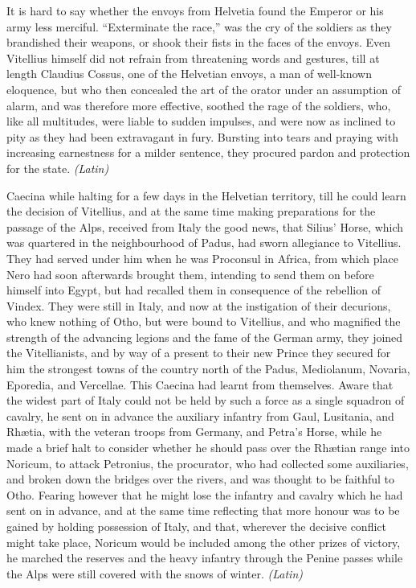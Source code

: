
It is hard to say whether the envoys from Helvetia found the Emperor or his army less merciful. ``Exterminate the race,'' was the cry of the soldiers as they brandished their weapons, or shook their fists in the faces of the envoys. Even Vitellius himself did not refrain from threatening words and gestures, till at length Claudius Cossus, one of the Helvetian envoys, a man of well-known eloquence, but who then concealed the art of the orator under an assumption of alarm, and was therefore more effective, soothed the rage of the soldiers, who, like all multitudes, were liable to sudden impulses, and were now as inclined to pity as they had been extravagant in fury. Bursting into tears and praying with increasing earnestness for a milder sentence, they procured pardon and protection for the state. \emph{(Latin)}


Caecina while halting for a few days in the Helvetian territory, till he could learn the decision of Vitellius, and at the same time making preparations for the passage of the Alps, received from Italy the good news, that Silius' Horse, which was quartered in the neighbourhood of Padus, had sworn allegiance to Vitellius. They had served under him when he was Proconsul in Africa, from which place Nero had soon afterwards brought them, intending to send them on before himself into Egypt, but had recalled them in consequence of the rebellion of Vindex. They were still in Italy, and now at the instigation of their decurions, who knew nothing of Otho, but were bound to Vitellius, and who magnified the strength of the advancing legions and the fame of the German army, they joined the Vitellianists, and by way of a present to their new Prince they secured for him the strongest towns of the country north of the Padus, Mediolanum, Novaria, Eporedia, and Vercellae. This Caecina had learnt from themselves. Aware that the widest part of Italy could not be held by such a force as a single squadron of cavalry, he sent on in advance the auxiliary infantry from Gaul, Lusitania, and Rhætia, with the veteran troops from Germany, and Petra's Horse, while he made a brief halt to consider whether he should pass over the Rhætian range into Noricum, to attack Petronius, the procurator, who had collected some auxiliaries, and broken down the bridges over the rivers, and was thought to be faithful to Otho. Fearing however that he might lose the infantry and cavalry which he had sent on in advance, and at the same time reflecting that more honour was to be gained by holding possession of Italy, and that, wherever the decisive conflict might take place, Noricum would be included among the other prizes of victory, he marched the reserves and the heavy infantry through the Penine passes while the Alps were still covered with the snows of winter. \emph{(Latin)}

